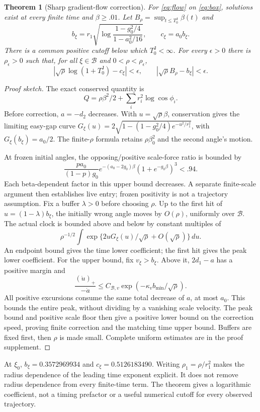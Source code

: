 \documentclass[10pt,a4paper]{article}
\newtheorem{theorem}{Theorem}
\newenvironment{sketch}{\begin{proof}[Proof sketch]}{\end{proof}}
\newcommand{\B}{\mathcal B}
\newcommand{\J}{\mathrm J}
\begin{document}
\begin{theorem}[Sharp gradient-flow correction]\label{thm:sharp}
For \eqref{eq:flow} on \eqref{eq:box}, solutions exist at every finite time and $\beta\ge.01$. Let $B_\rho=\sup_{t\le T_0^\J}\beta(t)$ and
\begin{equation}
b_\xi=r_1\sqrt{\log\frac{1-g_0^2/4}{1-a_0^2/16}},\qquad c_\xi=a_0b_\xi.
\label{eq:coeff}
\end{equation}
There is a common positive cutoff below which $T_0^\J<\infty$. For every $\epsilon>0$ there is $\rho_\epsilon>0$ such that, for all $\xi\in\B$ and $0<\rho<\rho_\epsilon$,
\begin{equation}
\left|\sqrt\rho\log(1+T_0^\J)-c_\xi\right|<\epsilon,
\qquad \left|\sqrt\rho B_\rho-b_\xi\right|<\epsilon.
\label{eq:sharp}
\end{equation}
\end{theorem}
\begin{sketch}
The exact conserved quantity is
\begin{equation}
Q=\rho\beta^2/2+\sum_i r_i^2\log\cos\phi_i.
\label{eq:inv}
\end{equation}
Before correction, $a=-d_2$ decreases. With $u=\sqrt\rho\beta$, conservation gives the limiting easy-gap curve
$G_\xi(u)=2\sqrt{1-(1-g_0^2/4)e^{-u^2/r_1^2}}$, with $G_\xi(b_\xi)=a_0/2$. The finite-$\rho$ formula retains $\rho\beta_0^2$ and the second angle's motion.

At frozen initial angles, the opposing/positive scale-force ratio is bounded by
\[
\frac{pa_0}{(1-p)g_0}e^{-(a_0-2g_0)\beta}(1+e^{-g_0\beta})^3<.94.
\]
Each beta-dependent factor in this upper bound decreases. A separate finite-scale argument then establishes live entry; frozen positivity is not a trajectory assumption. Fix a buffer $\lambda>0$ before choosing $\rho$. Up to the first hit of $u=(1-\lambda)b_\xi$, the initially wrong angle moves by $O(\rho)$, uniformly over $\B$. The actual clock is bounded above and below by constant multiples of
\[
\rho^{-1/2}\int \exp\{2uG_\xi(u)/\sqrt\rho+O(\sqrt\rho)\}\,du.
\]
An endpoint bound gives the time lower coefficient; the first hit gives the peak lower coefficient. For the upper bound, fix $v_\xi>b_\xi$. Above it, $2d_1-a$ has a positive margin and
\[
\frac{(\dot u)_+}{-\dot a}\le C_{\B,v}\exp(-\kappa_v b_{\min}/\sqrt\rho).
\]
All positive excursions consume the same total decrease of $a$, at most $a_0$. This bounds the entire peak, without dividing by a vanishing scale velocity. The peak bound and positive scale floor then give a positive lower bound on the correction speed, proving finite correction and the matching time upper bound. Buffers are fixed first, then $\rho$ is made small. Complete uniform estimates are in the proof supplement.
\end{sketch}
At $\xi_0$, $b_\xi=0.3572969934$ and $c_\xi=0.5126183490$. Writing $\rho_1=\rho/r_1^2$ makes the radius dependence of the leading time exponent explicit. It does not remove radius dependence from every finite-time term. The theorem gives a logarithmic coefficient, not a timing prefactor or a useful numerical cutoff for every observed trajectory.
\end{document}
